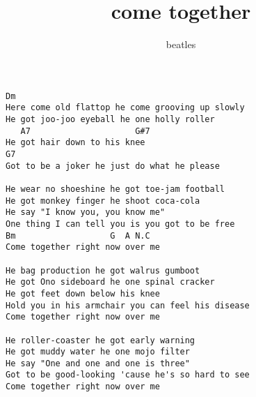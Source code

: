 \author{beatles}
\title{come together}
\maketitle
\begin{verbatim}
Dm
Here come old flattop he come grooving up slowly 
He got joo-joo eyeball he one holly roller 
   A7                     G#7
He got hair down to his knee 
G7
Got to be a joker he just do what he please 

He wear no shoeshine he got toe-jam football 
He got monkey finger he shoot coca-cola 
He say "I know you, you know me" 
One thing I can tell you is you got to be free 
Bm                   G  A N.C
Come together right now over me 

He bag production he got walrus gumboot 
He got Ono sideboard he one spinal cracker 
He got feet down below his knee 
Hold you in his armchair you can feel his disease 
Come together right now over me 

He roller-coaster he got early warning 
He got muddy water he one mojo filter 
He say "One and one and one is three" 
Got to be good-looking 'cause he's so hard to see 
Come together right now over me
\end{verbatim}
